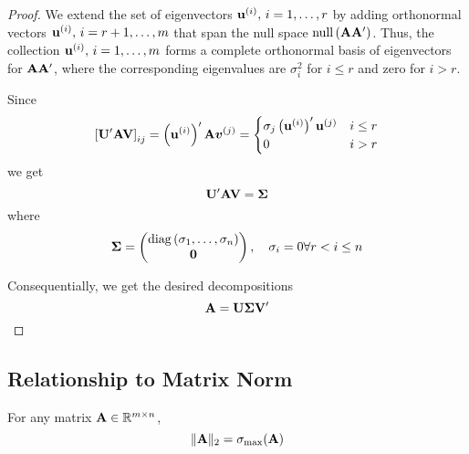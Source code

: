 \begin{proof}
	We extend the set of eigenvectors \(\mathbf{u}^{(i)},\,i=1,\ldots,r\) by adding orthonormal vectors \(\mathbf{u}^{(i)},\,i=r+1,\ldots,m\) that span the null space \(\operatorname{null}\left(\mathbf{A}\mathbf{A}^{\prime}\right)\). Thus, the collection \(\mathbf{u}^{(i)},\,i=1,\ldots,m\) forms a complete orthonormal basis of eigenvectors for \(\mathbf{A}\mathbf{A}^{\prime}\), where the corresponding eigenvalues are \(\sigma_{i}^{2}\) for \(i\leq r\) and zero for \(i>r\).

	Since
	\begin{equation*}
		\left[\mathbf{U}^{\prime}\mathbf{A}\mathbf{V}\right]_{ij}=\left(\mathbf{u}^{(i)}\right)^{\prime}\mathbf{A}\boldsymbol{v}^{(j)}=\begin{cases}\sigma_{j}\left(\mathbf{u}^{(i)}\right)^{\prime}\mathbf{u}^{(j)} & i \leq r \\ 0 & i>r\end{cases}
	\end{equation*}
	we get
	\begin{equation*}
		\mathbf{U}^{\prime}\mathbf{A}\mathbf{V}=\boldsymbol{\Sigma}
	\end{equation*}
	where
	\begin{equation*}
		\boldsymbol{\Sigma}=\begin{pmatrix}
			\operatorname{diag}\left(\sigma_{1},\ldots,\sigma_{n}\right) \\
			\mathbf{0}
		\end{pmatrix}
		,\quad\sigma_{i}=0\forall r<i\leq n
	\end{equation*}

	Consequentially, we get the desired decompositions
	\begin{equation*}
		\mathbf{A}=\mathbf{U}\boldsymbol{\Sigma}\mathbf{V}^{\prime}
	\end{equation*}
\end{proof}

\subsection{Relationship to Matrix Norm}

\begin{theorem}
	For any matrix \(\mathbf{A}\in\mathbb{R}^{m\times n}\),
	\begin{equation}
		\|\mathbf{A}\|_{2}=\sigma_{\max}(\mathbf{A})
	\end{equation}
\end{theorem}

